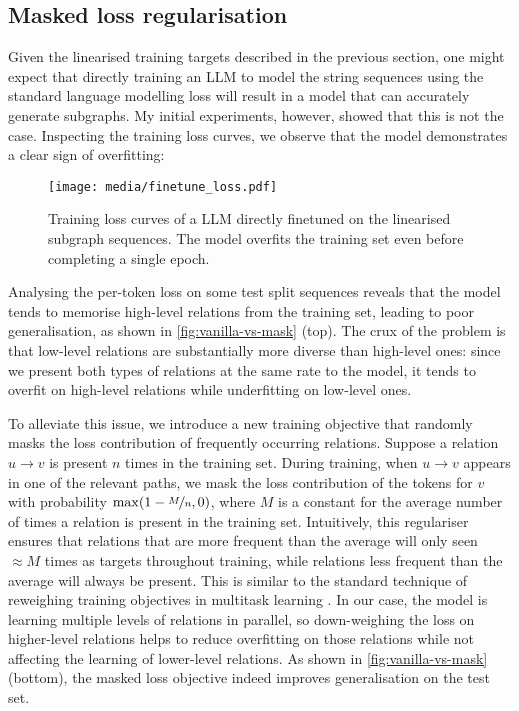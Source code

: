 \subsection{Masked loss regularisation}

Given the linearised training targets described in the previous section, one might expect that directly training an LLM to model the string sequences using the standard language modelling loss will result in a model that can accurately generate subgraphs. My initial experiments, however, showed that this is not the case. Inspecting the training loss curves, we observe that the model demonstrates a clear sign of overfitting:
\begin{figure}[H]
    \centering
    \texttt{[image: media/finetune\_loss.pdf]}
    \captionsetup{width=0.6\linewidth}
    \caption{Training loss curves of a LLM directly finetuned on the linearised subgraph sequences. The model overfits the training set even before completing a single epoch.}
\end{figure}
Analysing the per-token loss on some test split sequences reveals that the model tends to memorise high-level relations from the training set, leading to poor generalisation, as shown in \cref{fig:vanilla-vs-mask} (top). The crux of the problem is that low-level relations are substantially more diverse than high-level ones: since we present both types of relations at the same rate to the model, it tends to overfit on high-level relations while underfitting on low-level ones.



To alleviate this issue, we introduce a new training objective that randomly masks the loss contribution of frequently occurring relations. Suppose a relation $u \to v$ is present $n$ times in the training set. During training, when $u \to v$ appears in one of the relevant paths, we mask the loss contribution of the tokens for $v$ with probability $\max(1 - \nicefrac{M}{n}, 0)$, where $M$ is a constant for the average number of times a relation is present in the training set. Intuitively, this regulariser ensures that relations that are more frequent than the average will only seen $\approx\!M$ times as targets throughout training, while relations less frequent than the average will always be present. This is similar to the standard technique of reweighing training objectives in multitask learning \cite{caruana1997multitask}. In our case, the model is learning multiple levels of relations in parallel, so down-weighing the loss on higher-level relations helps to reduce overfitting on those relations while not affecting the learning of lower-level relations. As shown in \cref{fig:vanilla-vs-mask} (bottom), the masked loss objective indeed improves generalisation on the test set.

